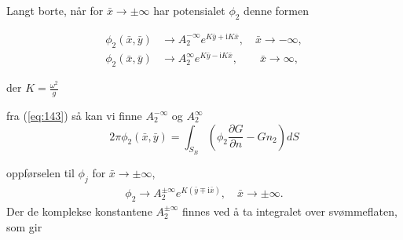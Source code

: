 Langt borte, når for $\bar{x} \rightarrow \pm \infty$ har potensialet $\phi_2$  denne formen

\begin{align}
	\phi_2(\bar{x},\bar{y}) &\rightarrow A_2^{-\infty} e^{K\bar{y} + \mathrm{i} K\bar{x}}, \quad \bar{x} \rightarrow -\infty, \\
	\phi_2(\bar{x},\bar{y}) &\rightarrow A_2^{\infty} e^{K\bar{y} - \textsf{i} K\bar{x}}, \qquad \bar{x} \rightarrow \infty,
\end{align}

der $K = \frac{\omega^2}{g}$

fra (\ref{eq:143}) så kan vi finne $A_2^{-\infty}$ og $A_2^{\infty}$
\begin{equation}
    2\pi \phi_2(\bar{x},\bar{y})  = \int_{S_B}  ( \phi_2  \frac{\partial G }{\partial n}-G n_2 )dS
\end{equation}

oppførselen til $\phi_j$ for $\bar{x} \rightarrow \pm \infty$,
\begin{align}
\phi_2 \rightarrow A_2^{\pm \infty} e^{K (\bar{y} \mp \mathrm{i}  \bar{x}) }, \quad \bar{x} \rightarrow \pm \infty.
\end{align}
Der de komplekse konstantene $A_2^{\pm \infty}$ finnes ved å ta integralet over svømmeflaten, som gir
